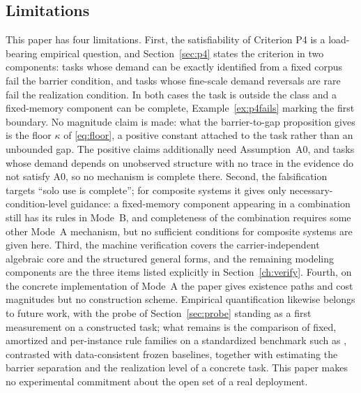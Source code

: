 \subsection{Limitations}

This paper has four limitations. First, the satisfiability of Criterion P4 is a load-bearing empirical question, and Section~\ref{sec:p4} states the criterion in two components: tasks whose demand can be exactly identified from a fixed corpus fail the barrier condition, and tasks whose fine-scale demand reversals are rare fail the realization condition. In both cases the task is outside the class and a fixed-memory component can be complete, Example~\ref{ex:p4fails} marking the first boundary. No magnitude claim is made: what the barrier-to-gap proposition gives is the floor $\kappa$ of \eqref{eq:floor}, a positive constant attached to the task rather than an unbounded gap. The positive claims additionally need Assumption~A0, and tasks whose demand depends on unobserved structure with no trace in the evidence do not satisfy A0, so no mechanism is complete there. Second, the falsification targets ``solo use is complete''; for composite systems it gives only necessary-condition-level guidance: a fixed-memory component appearing in a combination still has its rules in Mode~B, and completeness of the combination requires some other Mode~A mechanism, but no sufficient conditions for composite systems are given here. Third, the machine verification covers the carrier-independent algebraic core and the structured general forms, and the remaining modeling components are the three items listed explicitly in Section~\ref{ch:verify}. Fourth, on the concrete implementation of Mode~A the paper gives existence paths and cost magnitudes but no construction scheme. Empirical quantification likewise belongs to future work, with the probe of Section~\ref{sec:probe} standing as a first measurement on a constructed task; what remains is the comparison of fixed, amortized and per-instance rule families on a standardized benchmark such as \citep{leuschner2021}, contrasted with data-consistent frozen baselines, together with estimating the barrier separation and the realization level of a concrete task. This paper makes no experimental commitment about the open set of a real deployment.
